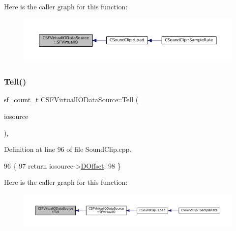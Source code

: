 Here is the caller graph for this function\+:
\nopagebreak
\begin{figure}[H]
\begin{center}
\leavevmode
\includegraphics[width=350pt]{classCSFVirtualIODataSource_a9c15fbbe734fdfc2af17ca8f424b7e43_icgraph}
\end{center}
\end{figure}
\hypertarget{classCSFVirtualIODataSource_aae8e2b59f9753ed1f8baca1561b15962}{}\label{classCSFVirtualIODataSource_aae8e2b59f9753ed1f8baca1561b15962} 
\subsubsection{\texorpdfstring{Tell()}{Tell()}}
{\footnotesize\ttfamily sf\+\_\+count\+\_\+t C\+S\+F\+Virtual\+I\+O\+Data\+Source\+::\+Tell (\begin{DoxyParamCaption}\item[{\hyperlink{classCSFVirtualIODataSource}{C\+S\+F\+Virtual\+I\+O\+Data\+Source} $\ast$}]{iosource }\end{DoxyParamCaption})\hspace{0.3cm}{\ttfamily [static]}, {\ttfamily [protected]}}



Definition at line 96 of file Sound\+Clip.\+cpp.


\begin{DoxyCode}
96                                                                        \{
97     \textcolor{keywordflow}{return} iosource->\hyperlink{classCSFVirtualIODataSource_a29db7bf8a3a7103deacb80bf619919c8}{DOffset};
98 \}
\end{DoxyCode}
Here is the caller graph for this function\+:
\nopagebreak
\begin{figure}[H]
\begin{center}
\leavevmode
\includegraphics[width=350pt]{classCSFVirtualIODataSource_aae8e2b59f9753ed1f8baca1561b15962_icgraph}
\end{center}
\end{figure}
\hypertarget{classCSFVirtualIODataSource_ac1d38c4c9d8ba3e0a2affd7dd72283ee}{}\label{classCSFVirtualIODataSource_ac1d38c4c9d8ba3e0a2affd7dd72283ee} 

